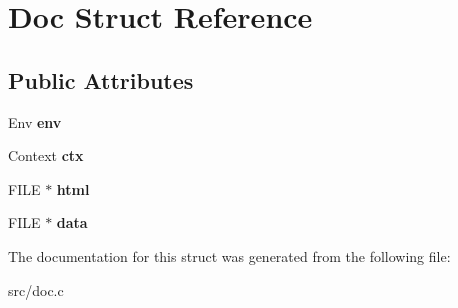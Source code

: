 \hypertarget{structDoc}{}\section{Doc Struct Reference}
\label{structDoc}
\subsection*{Public Attributes}
\begin{DoxyCompactItemize}
\item 
\hypertarget{structDoc_a5537a5594048f62ca59d70e520b87adc}{}\label{structDoc_a5537a5594048f62ca59d70e520b87adc} 
Env {\bfseries env}
\item 
\hypertarget{structDoc_a0bc8db9097d59fdb6b6c05b6b93df370}{}\label{structDoc_a0bc8db9097d59fdb6b6c05b6b93df370} 
Context {\bfseries ctx}
\item 
\hypertarget{structDoc_aed95759a68368529731d54570469986b}{}\label{structDoc_aed95759a68368529731d54570469986b} 
F\+I\+LE $\ast$ {\bfseries html}
\item 
\hypertarget{structDoc_a9e4fa452e83a68f50092576c8e209b7b}{}\label{structDoc_a9e4fa452e83a68f50092576c8e209b7b} 
F\+I\+LE $\ast$ {\bfseries data}
\end{DoxyCompactItemize}


The documentation for this struct was generated from the following file\+:\begin{DoxyCompactItemize}
\item 
src/doc.\+c\end{DoxyCompactItemize}
